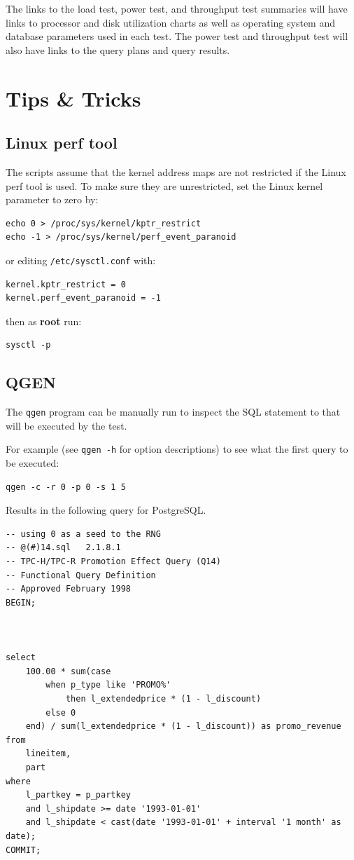 \documentclass{article}
\begin{document}
The links to the load test, power test, and throughput test summaries will have
links to processor and disk utilization charts as well as operating system and
database parameters used in each test.  The power test and throughput test will
also have links to the query plans and query results.

\section{Tips \& Tricks}

\subsection{Linux perf tool}

The scripts assume that the kernel address maps are not restricted if the Linux
perf tool is used.  To make sure they are unrestricted, set the Linux kernel
parameter to zero by:

\lstset{language=sh}
\begin{lstlisting}
echo 0 > /proc/sys/kernel/kptr_restrict
echo -1 > /proc/sys/kernel/perf_event_paranoid
\end{lstlisting}

or editing \texttt{/etc/sysctl.conf} with:
\lstset{language=sh}
\begin{lstlisting}
kernel.kptr_restrict = 0
kernel.perf_event_paranoid = -1
\end{lstlisting}

then as \textbf{root} run:
\lstset{language=sh}
\begin{lstlisting}
sysctl -p
\end{lstlisting}

\subsection{QGEN}

The \texttt{qgen} program can be manually run to inspect the SQL statement to
that will be executed by the test.

For example (see \texttt{qgen -h} for option descriptions) to see what the
first query to be executed:

\lstset{language=sh}
\begin{lstlisting}
qgen -c -r 0 -p 0 -s 1 5
\end{lstlisting}

Results in the following query for PostgreSQL.

\lstset{language=sql}
\begin{lstlisting}
-- using 0 as a seed to the RNG
-- @(#)14.sql	2.1.8.1
-- TPC-H/TPC-R Promotion Effect Query (Q14)
-- Functional Query Definition
-- Approved February 1998
BEGIN;



select
	100.00 * sum(case
		when p_type like 'PROMO%'
			then l_extendedprice * (1 - l_discount)
		else 0
	end) / sum(l_extendedprice * (1 - l_discount)) as promo_revenue
from
	lineitem,
	part
where
	l_partkey = p_partkey
	and l_shipdate >= date '1993-01-01'
	and l_shipdate < cast(date '1993-01-01' + interval '1 month' as date);
COMMIT;
\end{lstlisting}
\end{document}
